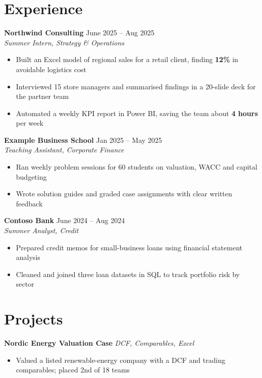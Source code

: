 \documentclass[10pt, a4paper]{article}   %
\newcommand{\expentry}[3]{%
    \noindent\textbf{#1} \hfill {\small #2}\\[-1pt]
    {\small\textit{#3}}\vspace{1pt}%
}
\newcommand{\projnolink}[2]{%
    \noindent\textbf{#1} \hfill {\small\textit{#2}}%
}
\begin{document}
\section{Experience}

\expentry{Northwind Consulting}{June 2025 -- Aug 2025}{Summer Intern, Strategy \& Operations}
\begin{itemize}
    \item Built an Excel model of regional sales for a retail client, finding \textbf{12\%} in
          avoidable logistics cost
    \item Interviewed 15 store managers and summarised findings in a 20-slide deck for the partner team
    \item Automated a weekly KPI report in Power BI, saving the team about \textbf{4 hours} per week
\end{itemize}

\vspace{4pt}
\expentry{Example Business School}{Jan 2025 -- May 2025}{Teaching Assistant, Corporate Finance}
\begin{itemize}
    \item Ran weekly problem sessions for 60 students on valuation, WACC and capital budgeting
    \item Wrote solution guides and graded case assignments with clear written feedback
\end{itemize}

\vspace{4pt}
\expentry{Contoso Bank}{June 2024 -- Aug 2024}{Summer Analyst, Credit}
\begin{itemize}
    \item Prepared credit memos for small-business loans using financial statement analysis
    \item Cleaned and joined three loan datasets in SQL to track portfolio risk by sector
\end{itemize}

\section{Projects}

\projnolink{Nordic Energy Valuation Case}{DCF, Comparables, Excel}
\begin{itemize}
    \item Valued a listed renewable-energy company with a DCF and trading comparables; placed 2nd of 18 teams
\end{itemize}
\end{document}
